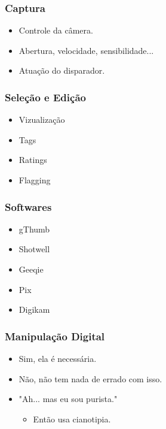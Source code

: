 
\begin{frame}
    \frametitle{Captura}
    \begin{itemize}
        \item Controle da câmera.
        \item Abertura, velocidade, sensibilidade...
        \item Atuação do disparador.
    \end{itemize}
\end{frame}


\begin{frame}
    \frametitle{Seleção e Edição}
    \begin{itemize}
        \item Vizualização
        \item Tags
        \item Ratings
        \item Flagging
    \end{itemize}
\end{frame}


\begin{frame}
    \frametitle{Softwares}
    \begin{itemize}
        \item gThumb
        \item Shotwell
        \item Geeqie
        \item Pix
        \item Digikam
    \end{itemize}
\end{frame}


\begin{frame}
    \frametitle{Manipulação Digital}
    \begin{itemize}
        \item Sim, ela é necessária.
        \item Não, não tem nada de errado com isso.
        \vfill
        \item "Ah... mas eu sou purista."
        \begin{itemize}
            \item Então usa cianotipia.
        \end{itemize}
    \end{itemize}
\end{frame}

